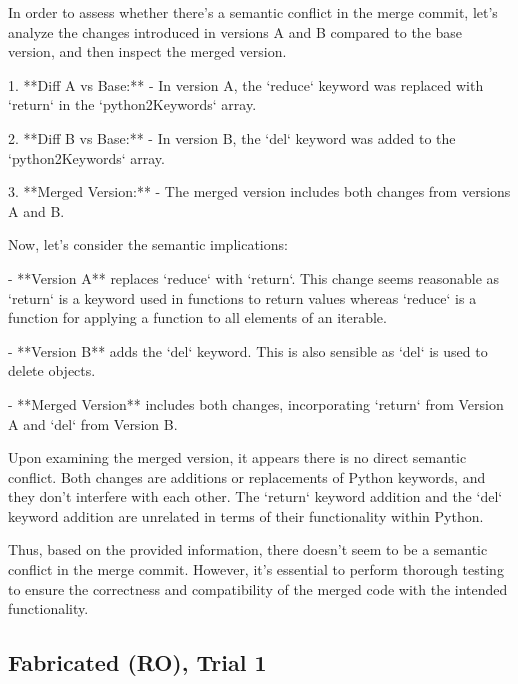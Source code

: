 \begin{response}
  In order to assess whether there's a semantic conflict in the merge commit, let's analyze the changes introduced in versions A and B compared to the base version, and then inspect the merged version.

  1. **Diff A vs Base:**
     - In version A, the `reduce` keyword was replaced with `return` in the `python2Keywords` array.
  
  2. **Diff B vs Base:**
     - In version B, the `del` keyword was added to the `python2Keywords` array.
  
  3. **Merged Version:**
     - The merged version includes both changes from versions A and B.
  
  Now, let's consider the semantic implications:
  
  - **Version A** replaces `reduce` with `return`. This change seems reasonable as `return` is a keyword used in functions to return values whereas `reduce` is a function for applying a function to all elements of an iterable.
    
  - **Version B** adds the `del` keyword. This is also sensible as `del` is used to delete objects.
  
  - **Merged Version** includes both changes, incorporating `return` from Version A and `del` from Version B.
  
  Upon examining the merged version, it appears there is no direct semantic conflict. Both changes are additions or replacements of Python keywords, and they don't interfere with each other. The `return` keyword addition and the `del` keyword addition are unrelated in terms of their functionality within Python.
  
  Thus, based on the provided information, there doesn't seem to be a semantic conflict in the merge commit. However, it's essential to perform thorough testing to ensure the correctness and compatibility of the merged code with the intended functionality.
\end{response}

\subsection{Fabricated (RO), Trial 1}

